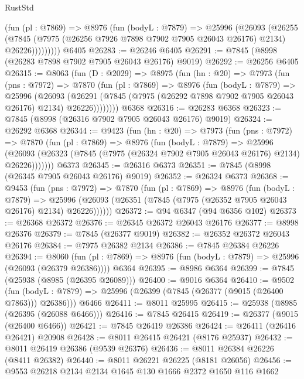 \begin{lexlean}{RustStd}
\begin{coremodule}
            (fun (pl : @7869) =>
            @8976
              (fun (bodyL : @7879) =>
              @25996
                (@26093
                  (@26255
                    (@7845
                      (@7975 (@26256 @7926 @7898 @7902 @7905 @26043 @26176) @2134)
                      @26226)))))))))
    @6405
@26283 := @26246 @6405
@26291 := @7845 (@8998 (@26283 @7898 @7902 @7905 @26043 @26176) @9019)
@26292 := @26256 @6405
@26315 := @8063
    (fun (D : @2029) =>
    @8975
      (fun (hn : @20) =>
      @7973
        (fun (pns : @7972) =>
        @7870
          (fun (pl : @7869) =>
          @8976
            (fun (bodyL : @7879) =>
            @25996
              (@26093
                (@26291 (@7845 (@7975 (@26292 @7898 @7902 @7905 @26043 @26176) @2134) @26226))))))))
    @6368
@26316 := @26283 @6368
@26323 := @7845 (@8998 (@26316 @7902 @7905 @26043 @26176) @9019)
@26324 := @26292 @6368
@26344 := @9423
    (fun (hn : @20) =>
    @7973
      (fun (pns : @7972) =>
      @7870
        (fun (pl : @7869) =>
        @8976
          (fun (bodyL : @7879) =>
          @25996
            (@26093 (@26323 (@7845 (@7975 (@26324 @7902 @7905 @26043 @26176) @2134) @26226)))))))
    @6373
@26345 := @26316 @6373
@26351 := @7845 (@8998 (@26345 @7905 @26043 @26176) @9019)
@26352 := @26324 @6373
@26368 := @9453
    (fun (pns : @7972) =>
    @7870
      (fun (pl : @7869) =>
      @8976
        (fun (bodyL : @7879) =>
        @25996 (@26093 (@26351 (@7845 (@7975 (@26352 @7905 @26043 @26176) @2134) @26226))))))
@26372 := @94 @6347 (@94 @6356 @102)
@26373 := @26368 @26372
@26376 := @26345 @26372 @26043 @26176
@26377 := @8998 @26376
@26379 := @7845 (@26377 @9019)
@26382 := @26352 @26372 @26043 @26176
@26384 := @7975 @26382 @2134
@26386 := @7845 @26384 @26226
@26394 := @8060
    (fun (pl : @7869) => @8976 (fun (bodyL : @7879) => @25996 (@26093 (@26379 @26386))))
    @6364
@26395 := @8986 @6364
@26399 := @7845 (@25938 (@8985 (@26395 @26089)))
@26400 := @9016 @6364
@26410 := @9502
    (fun (bodyL : @7879) => @25996 (@26399 (@7845 (@26377 (@9015 (@26400 @7863))) @26386)))
    @6466
@26411 := @8011 @25995
@26415 := @25938 (@8985 (@26395 (@26088 @6466)))
@26416 := @7845 @26415
@26419 := @26377 (@9015 (@26400 @6466))
@26421 := @7845 @26419 @26386
@26424 := @26411 (@26416 @26421) @20908
@26428 := @8011 @26415 @26421 (@8176 @25937)
@26432 := @8011 @26419 @26386 (@9539 @26376)
@26436 := @8011 @26384 @26226 (@8411 @26382)
@26440 := @8011 @26221 @26225 (@8181 @26056)
@26456 := @9553
    @26218
    @2134
    @2134
    @1645
    @130
    @1666
    @2372
    @1650
    @116
    @1662

\end{coremodule}
\end{lexlean}
